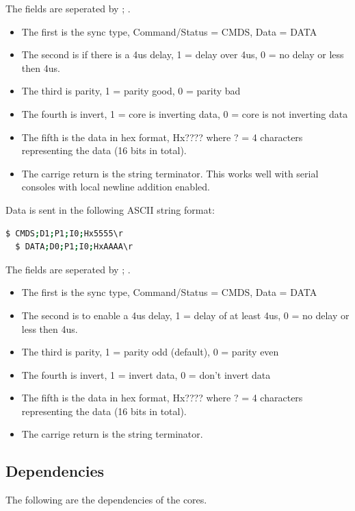 \par
The fields are seperated by ; .

\begin{itemize}
\item The first is the sync type, Command/Status = CMDS, Data = DATA
\item The second is if there is a 4us delay, 1 = delay over 4us, 0 = no delay or less then 4us.
\item The third is parity, 1 = parity good, 0 = parity bad
\item The fourth is invert, 1 = core is inverting data, 0 = core is not inverting data
\item The fifth is the data in hex format, Hx???? where ? = 4 characters representing the data (16 bits in total).
\item The carrige return is the string terminator. This works well with serial consoles with local newline addition enabled.
\end{itemize}

\par
Data is sent in the following ASCII string format:
\begin{lstlisting}[language=bash]
  $ CMDS;D1;P1;I0;Hx5555\r
  $ DATA;D0;P1;I0;HxAAAA\r
\end{lstlisting}

\par
The fields are seperated by ; .

\begin{itemize}
\item The first is the sync type, Command/Status = CMDS, Data = DATA
\item The second is to enable a 4us delay, 1 = delay of at least 4us, 0 = no delay or less then 4us.
\item The third is parity, 1 = parity odd (default), 0 = parity even
\item The fourth is invert, 1 = invert data, 0 = don't invert data
\item The fifth is the data in hex format, Hx???? where ? = 4 characters representing the data (16 bits in total).
\item The carrige return is the string terminator.
\end{itemize}

\subsection{Dependencies}

\par
The following are the dependencies of the cores.

